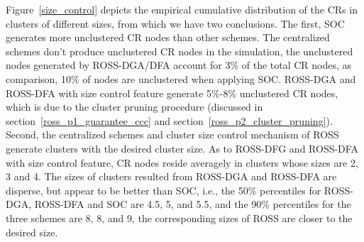 \documentclass[10pt,journal,compsoc]{IEEEtran}
\theoremstyle{mytheoremstyle}
\theoremstyle{mytheoremstyle}
\theoremstyle{mytheoremstyle}
\newcommand{\ie}{i.e., }
\begin{document}
Figure~\ref{size_control} depicts the empirical cumulative distribution of the CRs in clusters of different sizes, from which we have two conclusions.
The first, SOC generates more unclustered CR nodes than other schemes.
The centralized schemes don't produce unclustered CR nodes in the simulation, the unclustered nodes generated by ROSS-DGA/DFA account for 3\% of the total CR nodes, as comparison, 10\% of nodes are unclustered when applying SOC.
ROSS-DGA and ROSS-DFA with size control feature generate 5\%-8\% unclustered CR nodes, which is due to the cluster pruning procedure (discussed in section~\ref{ross_p1_guarantee_ccc} and section~\ref{ross_p2_cluster_pruning}).
Second, the centralized schemes and cluster size control mechanism of ROSS generate clusters with the desired cluster size.
As to ROSS-DFG and ROSS-DFA with size control feature, CR nodes reside averagely in clusters whose sizes are 2, 3 and 4.
The sizes of clusters resulted from ROSS-DGA and ROSS-DFA are disperse, but appear to be better than SOC, i.e., the 50\% percentiles for ROSS-DGA, ROSS-DFA and SOC are 4.5, 5, and 5.5, and the 90\% percentiles for the three schemes are 8, 8, and 9, the corresponding sizes of ROSS are closer to the desired size.
\end{document}
